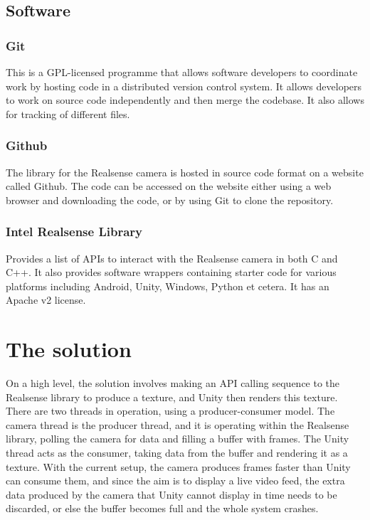     \subsection{Software}
        \subsubsection{Git}
        This is a GPL-licensed programme that allows software developers to coordinate work by hosting code in a distributed version control system. It allows developers to work on source code independently and then merge the codebase. It also allows for tracking of different files.
        \subsubsection{Github}
        The library for the Realsense camera is hosted in source code format on a website called Github. The code can be accessed on the website either using a web browser and downloading the code, or by using Git to clone the repository.
        \subsubsection{Intel Realsense Library}
        Provides a list of APIs to interact with the Realsense camera in both C and C++. It also provides software wrappers containing starter code for various platforms including Android, Unity, Windows, Python et cetera. It has an Apache v2 license.

\section{The solution}
    On a high level, the solution involves making an API calling sequence to the Realsense library to produce a texture, and Unity then renders this texture. There are two threads in operation, using a producer-consumer model. The camera thread is the producer thread, and it is operating within the Realsense library, polling the camera for data and filling a buffer with frames. The Unity thread acts as the consumer, taking data from the buffer and rendering it as a texture. With the current setup, the camera produces frames faster than Unity can consume them, and since the aim is to display a live video feed, the extra data produced by the camera that Unity cannot display in time needs to be discarded, or else the buffer becomes full and the whole system crashes.

